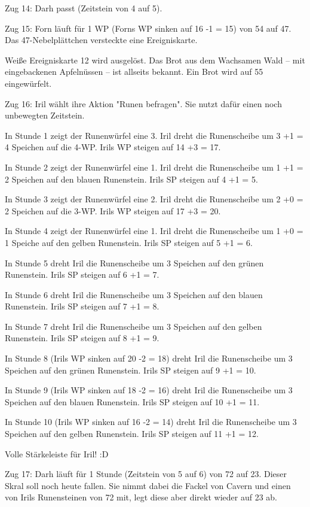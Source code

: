 \documentclass[10pt, a4paper, oneside]{book}
\begin{document}
{Zug 14: Darh passt (Zeitstein von 4 auf 5).



Zug 15: Forn läuft für 1 WP (Forns WP sinken auf 16 -1 = 15) von 54 auf 47. Das 47-Nebelplättchen versteckte eine Ereigniskarte.

Weiße Ereigniskarte 12 wird ausgelöst. Das Brot aus dem Wachsamen Wald – mit eingebackenen Apfelnüssen – ist allseits bekannt. Ein Brot wird auf 55 eingewürfelt.



Zug 16: Iril wählt ihre Aktion "Runen befragen". Sie nutzt dafür einen noch unbewegten Zeitstein.

In Stunde 1 zeigt der Runenwürfel eine 3. Iril dreht die Runenscheibe um 3 +1 = 4 Speichen auf die 4-WP. Irils WP steigen auf 14 +3 = 17.

In Stunde 2 zeigt der Runenwürfel eine 1. Iril dreht die Runenscheibe um 1 +1 = 2 Speichen auf den blauen Runenstein. Irils SP steigen auf 4 +1 = 5.

In Stunde 3 zeigt der Runenwürfel eine 2. Iril dreht die Runenscheibe um 2 +0 = 2 Speichen auf die 3-WP. Irils WP steigen auf 17 +3 = 20.

In Stunde 4 zeigt der Runenwürfel eine 1. Iril dreht die Runenscheibe um 1 +0 = 1 Speiche auf den gelben Runenstein. Irils SP steigen auf 5 +1 = 6.

In Stunde 5 dreht Iril die Runenscheibe um 3 Speichen auf den grünen Runenstein. Irils SP steigen auf 6 +1 = 7.

In Stunde 6 dreht Iril die Runenscheibe um 3 Speichen auf den blauen Runenstein. Irils SP steigen auf 7 +1 = 8.

In Stunde 7 dreht Iril die Runenscheibe um 3 Speichen auf den gelben Runenstein. Irils SP steigen auf 8 +1 = 9.

In Stunde 8 (Irils WP sinken auf 20 -2 = 18) dreht Iril die Runenscheibe um 3 Speichen auf den grünen Runenstein. Irils SP steigen auf 9 +1 = 10.

In Stunde 9 (Irils WP sinken auf 18 -2 = 16) dreht Iril die Runenscheibe um 3 Speichen auf den blauen Runenstein. Irils SP steigen auf 10 +1 = 11.

In Stunde 10 (Irils WP sinken auf 16 -2 = 14) dreht Iril die Runenscheibe um 3 Speichen auf den gelben Runenstein. Irils SP steigen auf 11 +1 = 12.

Volle Stärkeleiste für Iril! :D



Zug 17: Darh läuft für 1 Stunde (Zeitstein von 5 auf 6) von 72 auf 23. Dieser Skral soll noch heute fallen. Sie nimmt dabei die Fackel von Cavern und einen von Irils Runensteinen von 72 mit, legt diese aber direkt wieder auf 23 ab.



}
\end{document}
